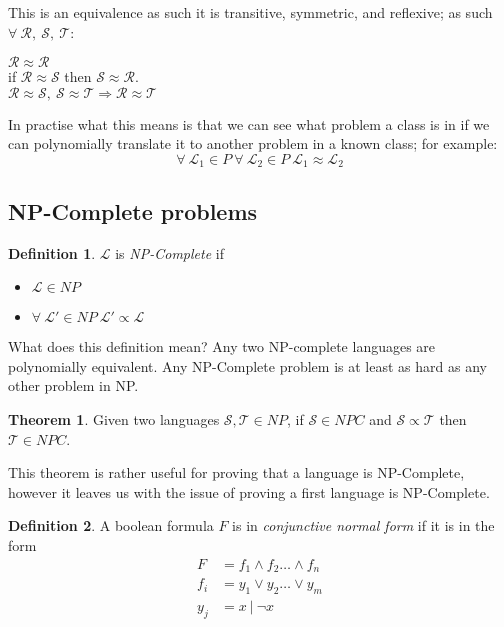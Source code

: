 \documentclass{article}
\theoremstyle{definition}
\newtheorem{definition}{Definition}[section]
\newtheorem{theorem}{Theorem}[section]
\begin{document}
This is an equivalence as such it is transitive, symmetric, and reflexive;
as such $\forall\ \mathcal{R},\ \mathcal{S},\ \mathcal{T}$:
\begin{center}
	$\mathcal{R} \approx \mathcal{R}$\\
	if $\mathcal{R} \approx \mathcal{S}$ then $\mathcal{S} \approx \mathcal{R}$.\\
	$
		\mathcal{R} \approx \mathcal{S},\ 
		\mathcal{S} \approx \mathcal{T} \Rightarrow
		\mathcal{R} \approx \mathcal{T}
	$
\end{center}

In practise what this means is that we can see what problem a class is in if we can
polynomially translate it to another problem in a known class; for example:
$$
  \forall\ \mathcal{L_1} \in P\ 
  \forall\ \mathcal{L_2} \in P\ 
  \mathcal{L_1} \approx \mathcal{L_2}
$$

\subsection{NP-Complete problems}
\begin{definition}
	$\mathcal{L}$ is \textit{NP-Complete} if
	\begin{itemize}
		\item $\mathcal{L} \in NP$
		\item $\forall\ \mathcal{L\prime} \in NP\ \mathcal{L\prime} \propto \mathcal{L}$
	\end{itemize}
\end{definition}

What does this definition mean?
Any two NP-complete languages are polynomially equivalent.
Any NP-Complete problem is at least as hard as any other problem in NP.

\begin{theorem}
	Given two languages $\mathcal{S}, \mathcal{T} \in NP$,
	if $\mathcal{S} \in NPC$ and $\mathcal{S} \propto \mathcal{T}$ then
	$\mathcal{T} \in NPC$.
\end{theorem}

This theorem is rather useful for proving that a language is NP-Complete,
however it leaves us with the issue of proving a first language is NP-Complete.

\begin{definition}
	A boolean formula $F$ is in \textit{conjunctive normal form} if it is in the form
	\begin{equation}
	\begin{split}
		F &= f_1 \land f_2 \dots \land f_n \\
		f_i &= y_1 \lor y_2 \dots \lor y_m \\
		y_j &= x\ |\ \neg x
	\end{split}
	\end{equation}
\end{definition}
\end{document}
